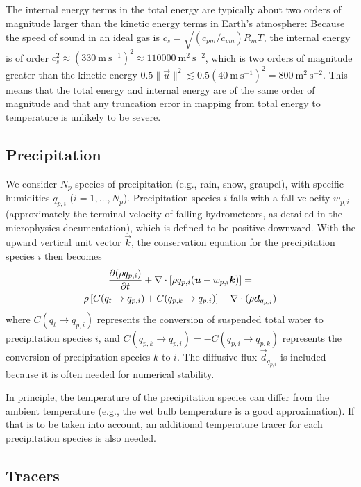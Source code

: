 \documentclass{report}
\begin{document}
The internal energy terms in the total energy are typically about two orders of magnitude larger than the kinetic energy terms in Earth's atmosphere: Because the speed of sound in an ideal gas is $c_s = \sqrt{(c_{pm}/c_{vm}) R_m T}$, the internal energy is of order $c_s^2 \approx (330~\mathrm{m~s^{-1}})^2 \approx 110000~\mathrm{m^2~s^{-2}}$, which is two orders of magnitude greater than the kinetic energy $0.5 \|\vec{u}\|^2 \lesssim 0.5(40~\mathrm{m~s^{-1}})^2 = 800~\mathrm{m^2~s^{-2}}$. This means that the total energy and internal energy are of the same order of magnitude and that any truncation error in mapping from total energy to temperature is unlikely to be severe.

\subsection{Precipitation}

We  consider $N_p$ species of precipitation (e.g., rain, snow, graupel), with specific humidities $q_{p,i}$ ($i=1,\dots,N_p$). Precipitation species $i$ falls with a fall velocity $w_{p,i}$ (approximately the terminal velocity of falling hydrometeors, as detailed in the microphysics documentation), which is defined to be positive downward. With the upward vertical unit vector $\vec{k}$, the conservation equation for the precipitation species $i$ then becomes
\begin{multline}
\frac{\partial (\rho q_{p,i})}{\partial t} + \nabla \cdot \left[\rho q_{p,i} (\boldsymbol{{u}} - w_{p,i} \boldsymbol{{k}}) \right] =\\
\rho \left[C(q_t \rightarrow q_{p,i}) + C(q_{p,k} \rightarrow q_{p,i}) \right] -\nabla \cdot (\rho \boldsymbol{{d}}_{q_{p, i}})
\label{eq:precip}
\end{multline}
where $C(q_t \rightarrow q_{p,i})$ represents the conversion of suspended total water to precipitation species $i$, and $C(q_{p,k} \rightarrow q_{p,i}) = -C(q_{p,i} \rightarrow q_{p,k})$ represents the conversion of precipitation species $k$ to $i$. The diffusive flux $\vec{d}_{q_{p, i}}$ is included because it is often needed for numerical stability.

In principle, the temperature of the precipitation species can differ from the ambient temperature (e.g., the wet bulb temperature is a good approximation). If that is to be taken into account, an additional temperature tracer for each precipitation species is also needed.

\subsection{Tracers}
\end{document}
